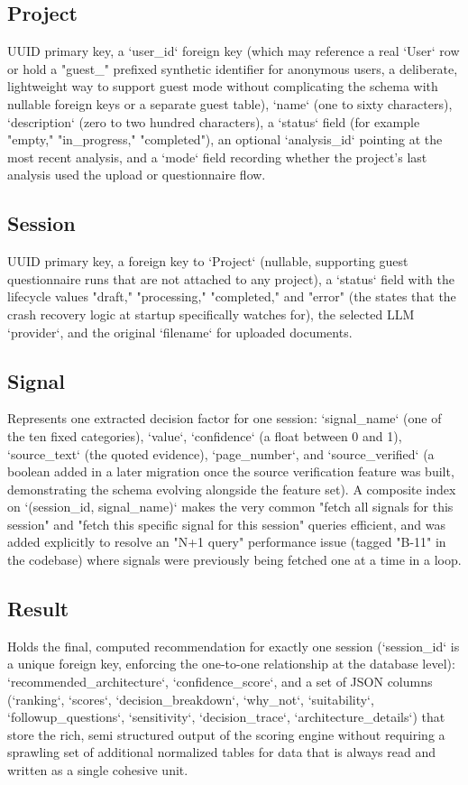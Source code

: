 \documentclass[11pt,a4paper]{report}
\begin{document}
\subsection{Project}
UUID primary key, a `user_id` foreign key (which may reference a real `User` row or hold a "guest\_" prefixed synthetic identifier for anonymous users, a deliberate, lightweight way to support guest mode without complicating the schema with nullable foreign keys or a separate guest table), `name` (one to sixty characters), `description` (zero to two hundred characters), a `status` field (for example "empty," "in\_progress," "completed"), an optional `analysis_id` pointing at the most recent analysis, and a `mode` field recording whether the project's last analysis used the upload or questionnaire flow.

\subsection{Session}
UUID primary key, a foreign key to `Project` (nullable, supporting guest questionnaire runs that are not attached to any project), a `status` field with the lifecycle values "draft," "processing," "completed," and "error" (the states that the crash recovery logic at startup specifically watches for), the selected LLM `provider`, and the original `filename` for uploaded documents.

\subsection{Signal}
Represents one extracted decision factor for one session: `signal_name` (one of the ten fixed categories), `value`, `confidence` (a float between 0 and 1), `source_text` (the quoted evidence), `page_number`, and `source_verified` (a boolean added in a later migration once the source verification feature was built, demonstrating the schema evolving alongside the feature set). A composite index on `(session_id, signal_name)` makes the very common "fetch all signals for this session" and "fetch this specific signal for this session" queries efficient, and was added explicitly to resolve an "N+1 query" performance issue (tagged "B-11" in the codebase) where signals were previously being fetched one at a time in a loop.

\subsection{Result}
Holds the final, computed recommendation for exactly one session (`session_id` is a unique foreign key, enforcing the one-to-one relationship at the database level): `recommended_architecture`, `confidence_score`, and a set of JSON columns (`ranking`, `scores`, `decision_breakdown`, `why_not`, `suitability`, `followup_questions`, `sensitivity`, `decision_trace`, `architecture_details`) that store the rich, semi structured output of the scoring engine without requiring a sprawling set of additional normalized tables for data that is always read and written as a single cohesive unit.
\end{document}
